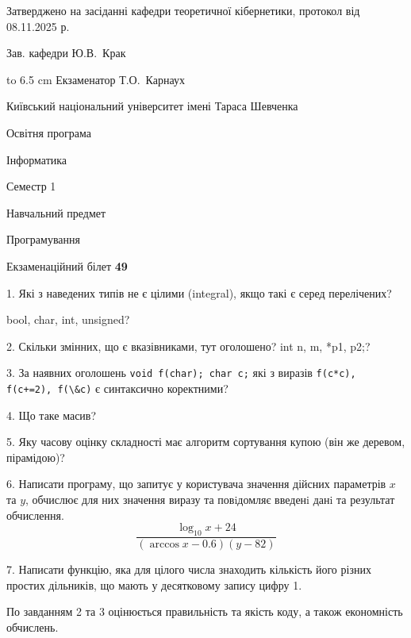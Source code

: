 \documentclass[12pt, ukrainian]{article}
\def\code#1{\Verb!#1!}
\begin{document}
{\smallskip\smallskip \begin {scriptsize} Затверджено на засіданні кафедри теоретичної кібернетики, протокол   від   08.11.2025 р.\par\smallskip\smallskip\smallskip\smallskip
{\parbox {6.5 cm} {Зав. кафедри \dotfill Ю.В.~Крак}}\hspace {0.7cm} {\hbox to 6.5 cm { Екзаменатор \dotfill Т.О.~Карнаух}} \end{scriptsize}}
\newpage
{{\begin {scriptsize}\par
{ \center  Київський національний університет імені Тараса Шевченка \par}
{\parbox {5 cm}{Освітня програма \hfill}{\parbox {7 cm}{Інформатика\hfill}}\parbox {6 cm}{\hfill Семестр 1}}\par
{\parbox {5 cm} {Навчальний предмет \hfill}\parbox {7 cm}{Програмування \hfill}\parbox {6cm}{\hfill}\par}\vspace{-15pt} \end{scriptsize}}{\center Екзаменаційний білет \No \textbf { 49 }\par}}
{%
1. Які з наведених типів не є цілими (integral), якщо такі є серед перелічених?

bool, char, int, unsigned?
\par
\vspace{2mm}
2. Скільки змінних, що є вказівниками, тут оголошено?
int n, m, *p1, p2;?
\par
\vspace{2mm}
3. За наявних оголошень \code{void f(char); char c;} які з виразів \code{f(c*c), f(c+=2), f(\&c)} є синтаксично коректними?
\par
\vspace{2mm}
4. Що таке масив?
\par
\vspace{2mm}
5. Яку часову оцінку складності має алгоритм сортування купою (він же деревом, пірамідою)?
\par
\vspace{2mm}
6. Написати програму, що запитує у користувача значення дійсних параметрів $x$ та $y$, обчислює для них значення виразу та повiдомляє введенi данi та результат обчислення.
$$\frac{\log_{10} x + 24}{(\arccos x - 0.6) (y - 82)}$$ 

\par
7. Написати функцію, яка для цілого числа знаходить кількість його різних простих дільників, що мають у десятковому запису цифру 1.

По завданням 2 та 3 оцінюється правильність та якість коду, а також економність обчислень.

}
\end{document}
